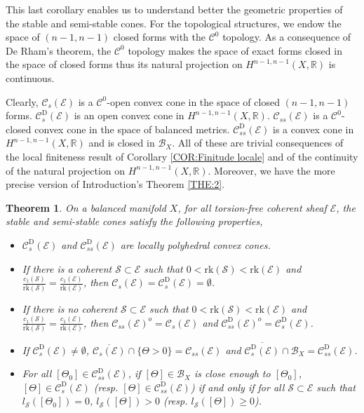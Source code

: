 \documentclass{article}
\newtheorem{theorem}{Theorem}[section]
\theoremstyle{remark}
\theoremstyle{definition}
\newcommand{\R}{\mathbb{R}}
\newcommand{\rk}{\mathrm{rk}}
\newcommand{\E}{\mathcal{E}}
\newcommand{\mC}{\mathcal{C}}
\renewcommand{\geq}{\geqslant}
\newcommand{\inter}[1]{#1^o}
\begin{document}
This last corollary enables us to understand better the geometric properties of the stable and semi-stable cones. For the topological structures, we endow the space of $(n - 1,n - 1)$ closed forms with the $\mC^0$ topology. As a consequence of De Rham's theorem, the $\mC^0$ topology makes the space of exact forms closed in the space of closed forms thus its natural projection on $H^{n - 1,n - 1}(X,\R)$ is continuous.

Clearly, $\mC_s(\E)$ is a $\mC^0$-open convex cone in the space of closed $(n - 1,n - 1)$ forms. $\mC_s^{\mathrm{D}}(\E)$ is an open convex cone in $H^{n - 1,n - 1}(X,\R)$. $\mC_{ss}(\E)$ is a $\mC^0$-closed convex cone in the space of balanced metrics. $\mC_{ss}^{\mathrm{D}}(\E)$ is a convex cone in $H^{n - 1,n - 1}(X,\R)$ and is closed in $\mathcal{B}_X$. All of these are trivial consequences of the local finiteness result of Corollary \ref{COR:Finitude locale} and of the continuity of the natural projection on $H^{n - 1,n - 1}(X,\R)$. Moreover, we have the more precise version of Introduction's Theorem \ref{THE:2}.
\begin{theorem}\label{THE:Structures cônes}
    On a balanced manifold $X$, for all torsion-free coherent sheaf $\E$, the stable and semi-stable cones satisfy the following properties,
    \begin{itemize}
        \item $\mC_s^{\mathrm{D}}(\E)$ and $\mC_{ss}^{\mathrm{D}}(\E)$ are locally polyhedral convex cones.
        \item If there is a coherent $\mathcal{S} \subset \E$ such that $0 < \rk(\mathcal{S}) < \rk(\E)$ and $\frac{c_1(\mathcal{S})}{\rk(\mathcal{S})} = \frac{c_1(\E)}{\rk(\E)}$, then $\mC_s(\E) = \mC_s^{\mathrm{D}}(\E) = \emptyset$.
        \item If there is no coherent $\mathcal{S} \subset \E$ such that $0 < \rk(\mathcal{S}) < \rk(\E)$ and $\frac{c_1(\mathcal{S})}{\rk(\mathcal{S})} = \frac{c_1(\E)}{\rk(\E)}$, then $\inter{\mC_{ss}(\E)} = \mC_s(\E)$ and $\inter{\mC_{ss}^{\mathrm{D}}(\E)} = \mC_s^{\mathrm{D}}(\E)$.
        \item If $\mC_s^{\mathrm{D}}(\E) \neq \emptyset$, $\overline{\mC_s(\E)} \cap \{\Theta > 0\} = \mC_{ss}(\E)$ and $\overline{\mC_s^{\mathrm{D}}(\E)} \cap \mathcal{B}_X = \mC_{ss}^{\mathrm{D}}(\E)$.
        \item For all $[\Theta_0] \in \mC_{ss}^{\mathrm{D}}(\E)$, if $[\Theta] \in \mathcal{B}_X$ is close enough to $[\Theta_0]$, $[\Theta] \in \mC_s^{\mathrm{D}}(\E)$ (resp. $[\Theta] \in \mC_{ss}^{\mathrm{D}}(\E)$) if and only if for all $\mathcal{S} \subset \E$ such that $l_{\mathcal{S}}([\Theta_0]) = 0$, $l_{\mathcal{S}}([\Theta]) > 0$ (resp. $l_{\mathcal{S}}([\Theta]) \geq 0$).
    \end{itemize}
\end{theorem}
\end{document}
